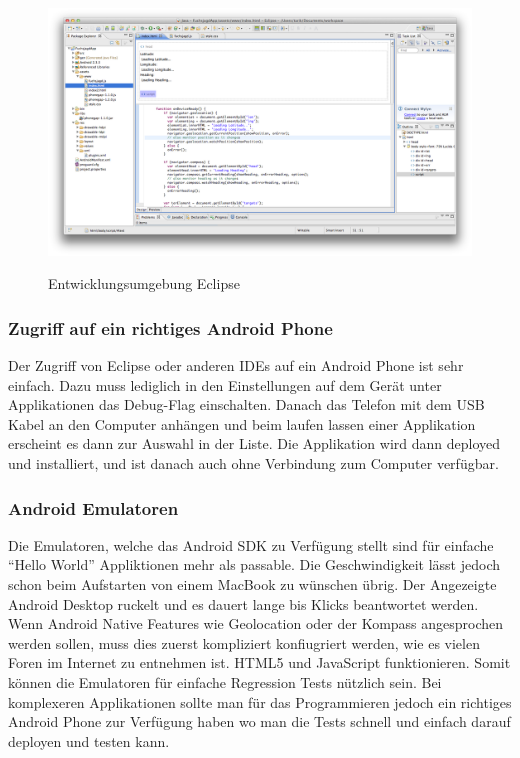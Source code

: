 \begin{figure}[H]
	\centering			      
        \includegraphics[width=14cm]{images/eclipse-shot.png}\\
		\caption{Entwicklungsumgebung Eclipse}
	\label{fig:eclipse-project}
\end{figure}

\subsubsection{Zugriff auf ein richtiges Android Phone} %
\label{ssub:Zugriff auf ein richtiges Android Phone}
Der Zugriff von Eclipse oder anderen IDEs auf ein Android Phone ist sehr einfach. Dazu muss lediglich in den Einstellungen auf dem Gerät unter Applikationen das Debug-Flag einschalten. Danach das Telefon mit dem USB Kabel an den Computer anhängen und beim laufen lassen einer Applikation erscheint es dann zur Auswahl in der Liste. Die Applikation wird dann deployed und installiert, und ist danach auch ohne Verbindung zum Computer verfügbar.

\subsubsection{Android Emulatoren} %
\label{ssub:Android Emulatoren}
Die Emulatoren, welche das Android SDK zu Verfügung stellt sind für einfache "`Hello World"' Appliktionen mehr als passable. Die Geschwindigkeit lässt jedoch schon beim Aufstarten von einem MacBook zu wünschen übrig. Der Angezeigte Android Desktop ruckelt und es dauert lange bis Klicks beantwortet werden. Wenn Android Native Features wie Geolocation oder der Kompass angesprochen werden sollen, muss dies zuerst kompliziert konfiugriert werden, wie es vielen Foren im Internet zu entnehmen ist. HTML5 und JavaScript funktionieren. Somit können die Emulatoren für einfache Regression Tests nützlich sein. Bei komplexeren Applikationen sollte man für das Programmieren jedoch ein richtiges Android Phone zur Verfügung haben wo man die Tests schnell und einfach darauf deployen und testen kann.

